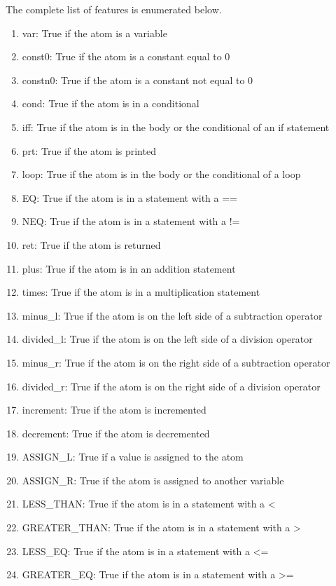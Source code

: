\documentclass{paper}
\begin{document}
The complete list of features is enumerated below.
\begin{enumerate}
\item var: True if the atom is a variable
\item const0: True if the atom is a constant equal to 0
\item constn0: True if the atom is a constant not equal to 0

\item cond: True if the atom is in a conditional
\item iff: True if the atom is in the body or the conditional of an if statement
\item prt: True if the atom  is printed
\item loop: True if the atom is in the body or the conditional of a loop
\item EQ: True if the atom is in a statement with a ==
\item NEQ: True if the atom is in a statement with a !=

\item ret: True if the atom is returned

\item plus: True if the atom is in an addition statement
\item times: True if the atom is in a multiplication statement
\item minus\_l: True if the atom is on the left side of a subtraction operator
\item divided\_l: True if the atom is on the left side of a division operator
\item minus\_r: True if the atom is on the right side of a subtraction operator
\item divided\_r: True if the atom is on the right side of a division operator
\item increment: True if the atom is incremented
\item decrement: True if the atom is decremented
\item ASSIGN\_L: True if a value is assigned to the atom 
\item ASSIGN\_R: True if the atom is assigned to another variable

\item LESS\_THAN: True if the atom is in a statement with a \textless
\item GREATER\_THAN: True if the atom is in a statement with a \textgreater
\item LESS\_EQ: True if the atom is in a statement with a \textless =
\item GREATER\_EQ: True if the atom is in a statement with a \textgreater =
\end{enumerate}
 
\end{document}
